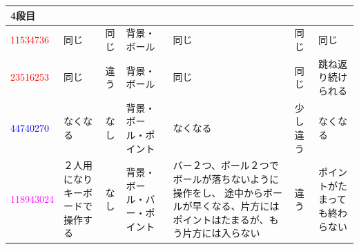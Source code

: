 \documentclass[a4paper,10pt,onecolumn,oneside,openany]{jsbook}
\begin{document}
\begin{table}[h]
\begin{center}
\begin{tabular}{|p{1.7cm}||p{1cm}|p{1cm}|p{1.7cm}|p{2cm}|p{1cm}|p{1.7cm}|}
4段目 &  &  &  &  &  &  \\ \hline
\textcolor{red}{11534736} & 同じ & 同じ & 背景・ボール & 同じ & 同じ & 同じ \\ \hline
\textcolor{red}{23516253} & 同じ & 違う & 背景・ボール & 同じ & 同じ & 跳ね返り続けられる \\ \hline
\textcolor{blue}{44740270} & なくなる & なし & 背景・ボール・ポイント & なくなる & 少し違う & なくなる \\ \hline
\textcolor{magenta}{118943024} & ２人用になりキーボードで操作する & なし & 背景・ボール・バー・ポイント & バー２つ、ボール２つでボールが落ちないように操作をし、 途中からボールが早くなる、片方にはポイントはたまるが、もう片方には入らない & 違う & ポイントがたまっても終わらない \\ \hline

\end{tabular}
\end{center}
\end{table}
\end{document}
